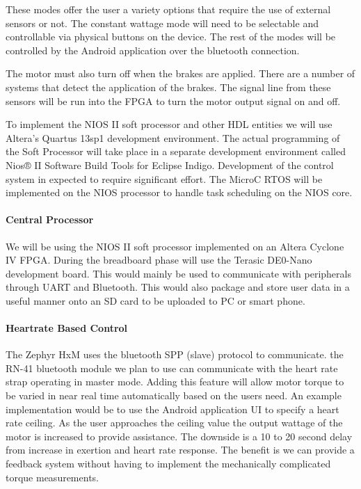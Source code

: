 \documentclass[12pt,article]{IEEEtran}
\begin{document}
            These modes offer the user a variety options that require the use of external sensors or not. The constant
            wattage mode will need to be selectable and controllable via physical buttons on the device. The rest of the
            modes will be controlled by the Android application over the bluetooth connection.
            
            The motor must also turn off when the brakes are applied. There are a number of systems that detect the application
            of the brakes. The signal line from these sensors will be run into the FPGA to turn the motor output signal on and off. 
            
            To implement the NIOS II soft processor and other HDL entities  we will use Altera’s Quartus 13sp1 development
            environment. The actual programming of the Soft Processor will take place in a separate development environment called
            Nios® II Software Build Tools for Eclipse Indigo. Development of the control system in expected to require significant 
            effort. The MicroC RTOS will be implemented on the NIOS processor to handle task scheduling on the NIOS core. 
    
        \paragraph{\bfseries Central Processor}
            We will be using the NIOS II soft processor implemented on an Altera Cyclone IV FPGA. During
            the breadboard phase will use the Terasic DE0-Nano development board. This would mainly be 
            used to communicate with peripherals through UART and Bluetooth. This would also package and 
            store user data in a useful manner onto an SD card to be uploaded to PC or smart phone. 
        
        \paragraph{\bfseries Heartrate Based Control}
            The Zephyr HxM uses the bluetooth SPP (slave) protocol to communicate. the RN-41 bluetooth module 
            we plan to use can communicate with the heart rate strap operating  in master mode. Adding this feature 
            will allow motor torque to be varied in near real time automatically based on the users need. An example 
            implementation would be to use the Android application UI to specify a heart rate ceiling. As the user approaches 
            the ceiling value the output wattage of the motor is increased to provide assistance. The downside 
            is a 10 to 20 second delay from increase in exertion and heart rate response. The benefit is we can 
            provide a feedback system without having to implement the mechanically complicated torque measurements. \cite{HxMAPI}
\end{document}
